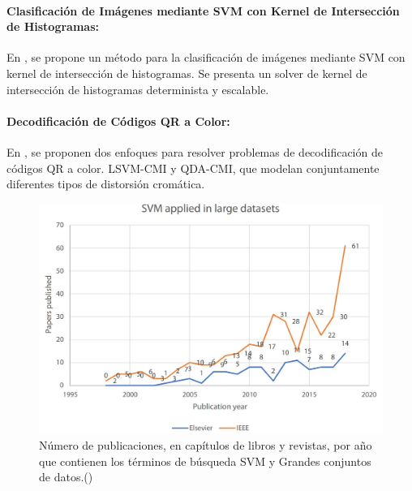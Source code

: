 \paragraph{Clasificación de Imágenes mediante SVM con Kernel de Intersección de Histogramas:} En \cite{svmm6}, se propone un método para la clasificación de imágenes mediante SVM con kernel de intersección de histogramas. Se presenta un solver de kernel de intersección de histogramas determinista y escalable.

\paragraph{Decodificación de Códigos QR a Color:} En \cite{svmm7}, se proponen dos enfoques para resolver problemas de decodificación de códigos QR a color. LSVM-CMI y QDA-CMI, que modelan conjuntamente diferentes tipos de distorsión cromática.


\begin{figure}[H]
	\begin{center}
		\includegraphics[width=1\textwidth]{2/figures/svm5.jpeg}
		\caption{Número de publicaciones, en capítulos de libros y revistas, por año que contienen los términos de búsqueda SVM y Grandes conjuntos de datos.(\cite{tecnica3})}
	\end{center}
\end{figure}

